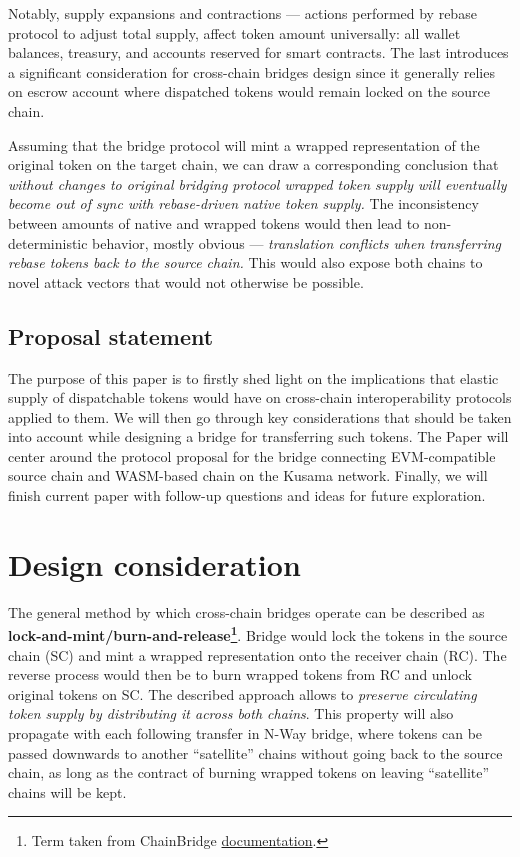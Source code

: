 \documentclass{article}
\begin{document}
Notably, supply expansions and contractions --- actions performed by rebase protocol to adjust total supply, affect token amount universally: all wallet balances, treasury, and accounts reserved for smart contracts. The last introduces a significant consideration for cross-chain bridges design since it generally relies on escrow account where dispatched tokens would remain locked on the source chain.

Assuming that the bridge protocol will mint a wrapped representation of the original token on the target chain, we can draw a corresponding conclusion that \textit{without changes to original bridging protocol wrapped token supply will eventually become out of sync with rebase-driven native token supply.} The inconsistency between amounts of native and wrapped tokens would then lead to non-deterministic behavior, mostly obvious --- \textit{translation conflicts when transferring rebase tokens back to the source chain.} This would also expose both chains to novel attack vectors that would not otherwise be possible.

\subsection{Proposal statement}

The purpose of this paper is to firstly shed light on the implications that elastic supply of dispatchable tokens would have on cross-chain interoperability protocols applied to them. We will then go through key considerations that should be taken into account while designing a bridge for transferring such tokens. The Paper will center around the protocol proposal for the bridge connecting EVM-compatible source chain and WASM-based chain on the Kusama network. Finally, we will finish current paper with follow-up questions and ideas for future exploration.

\section{Design consideration}

The general method by which cross-chain bridges operate can be described as \textbf{lock-and-mint/burn-and-release\footnote{Term taken from ChainBridge \href{https://chainbridge.chainsafe.io/live-evm-bridge}{documentation}.}}. Bridge would lock the tokens in the source chain (SC) and mint a wrapped representation onto the receiver chain (RC). The reverse process would then be to burn wrapped tokens from RC and unlock original tokens on SC. The described approach allows to \textit{preserve circulating token supply by distributing it across both chains}. This property will also propagate with each following transfer in N-Way bridge, where tokens can be passed downwards to another ``satellite'' chains without going back to the source chain, as long as the contract of burning wrapped tokens on leaving ``satellite'' chains will be kept.
\end{document}
